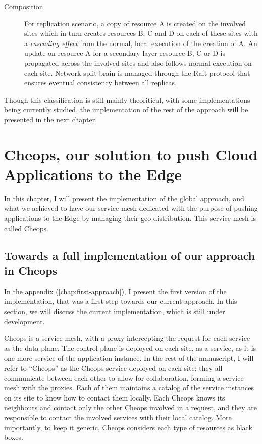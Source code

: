 \begin{description}
\item[Composition] For replication scenario, a copy of resource A is
  created on the involved sites which in turn creates resources B, C
  and D on each of these sites with a \emph{cascading effect} from the
  normal, local execution of the creation of A.
  An update on resource A for a secondary layer resource B, C or D is
  propagated across the involved sites and also follows normal
  execution on each site.
  Network split brain is managed through the Raft protocol that
  ensures eventual consistency between all replicas.

\end{description}

Though this classification is still mainly theoritical, with some
implementations being currently studied, the implementation of the
rest of the approach will be presented in the next chapter.


\chapter{Cheops, our solution to push Cloud Applications to the Edge}
\label{chap:cheops}

In this chapter, I will present the implementation of the global
approach, and what we achieved to have our service mesh dedicated with
the purpose of pushing applications to the Edge by managing their
geo-distribution.
%
This service mesh is called Cheops.


\section{Towards a full implementation of our approach in Cheops}
\label{sec:cheops-v1}

In the appendix (\autoref{chap:first-approach}), I present the first
version of the implementation, that was a first step towards our
current approach.
%
In this section, we will discuss the current implementation, which is
still under development.

Cheops is a service mesh, with a proxy intercepting the request for
each service as the data plane.
%
The control plane is deployed on each site, as a service, as it is one
more service of the application instance.
%
In the rest of the manuscript, I will refer to ``Cheops'' as the
Cheops service deployed on each site; they all communicate between
each other to allow for collaboration, forming a service mesh with the
proxies.
%
Each of them maintains a catalog of the service instances on its site
to know how to contact them locally.
%
Each Cheops knows its neighbours and contact only the other Cheops
involved in a request, and they are responsible to contact the
involved services with their local catalog.
%
More importantly, to keep it generic, Cheops considers each type of
resources as black boxes.


